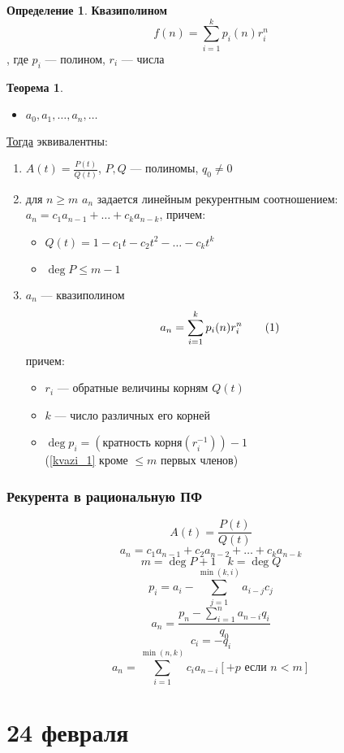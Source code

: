 \documentclass[oneside]{book}
\newcommand\addtag{\refstepcounter{equation}\tag{\theequation}}
\theoremstyle{plain}
\theoremstyle{remark}
\theoremstyle{definition}
\newtheorem{theorem}{Теорема}[section]
\newtheorem*{definition}{Определение}
\begin{document}
\begin{definition}
\textbf{Квазиполином}
\[ f(n) = \sum_{i = 1}^k p_i(n)r_i^n \], где \(p_i\) --- полином, \(r_i\) --- числа
\end{definition}
\begin{theorem}
\begin{itemize}
\item \(a_0, a_1, \dots, a_n, \dots\)
\end{itemize}
\uline{Тогда} эквивалентны:
\begin{enumerate}
\item \(A(t) = \frac{P(t)}{Q(t)}\), \(P, Q\) --- полиномы, \(q_0 \neq 0\)
\item для \(n \ge m\) \(a_n\) задается линейным рекурентным соотношением: \(a_n = c_1a_{n - 1} + \dots + c_ka_{n - k}\), причем:
\begin{itemize}
\item \(Q(t) = 1 - c_1t - c_2t^2 - \dots - c_kt^k\)
\item \(\deg P \le m - 1\)
\end{itemize}
\item \(a_n\) --- квазиполином \[ a_n = \sum_{i = 1}^k p_i(n)r_i^n \label{kvazi_1}\addtag \]
причем:
\begin{itemize}
\item \(r_i\) --- обратные величины корням \(Q(t)\)
\item \(k\) --- число различных его корней
\item \(\deg p_i = (\text{кратность корня}(r_i^{-1})) - 1\) \\
(\ref{kvazi_1} кроме \(\le m\) первых членов)
\end{itemize}
\end{enumerate}
\end{theorem}

\subsection{Рекурента в рациональную ПФ}
\label{sec:orgeb76707}
\[ A(t) = \frac{P(t)}{Q(t)} \]
\[ a_n = c_1 a_{n - 1} + c_2 a_{n - 2} + \dots + c_ka_{n - k} \]
\[ m = \deg P + 1\quad k = \deg Q \]
\[ p_i = a_i - \sum_{j = 1}^{\min(k, i)} a_{i - j} c_j \]
\[ a_n = \frac{p_n - \sum_{i = 1}^n a_{n - i}q_i}{q_0} \]
\[ c_i = -q_i \]
\[ a_n = \sum_{i = 1}^{\min(n, k)} c_i a_{n - i} [+ p\text{ если } n < m] \]
\chapter{24 февраля}
\label{sec:org53e25c8}
\end{document}
